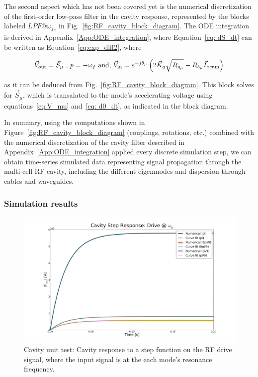 \documentclass[a4paper,12pt]{article}
\begin{document}
The second aspect which has not been covered yet is the numerical discretization of the first-order low-pass filter in the cavity response, represented by the blocks labeled $LPF@\omega_{f_{\mu}}$ in Fig.~\ref{fig:RF_cavity_block_diagram}. The ODE integration is derived in Appendix~\ref{App:ODE_integration}, where Equation~\ref{eq: dS_dt} can be written as Equation~\ref{eq:exp_diff2}, where

\begin{equation}
 \vec V_{\rm out} = \vec S_{\mu} \mbox{ , } p = -\omega_f \mbox{ and, } \vec V_{\rm in} = e^{-j\theta_{\mu}} \left(2\vec{K}_g\sqrt{R_{g_{\mu}}} - R_{b_{\mu}}\vec{I}_{\rm beam}\right)
\end{equation}

\noindent as it can be deduced from Fig.~\ref{fig:RF_cavity_block_diagram}. This block solves for $\vec S_{\mu}$, which is transalated to the mode's accelerating voltage using equations~\ref{eq:V_mu} and~\ref{eq: d0_dt}, as indicated in the block diagram.

In summary, using the computations shown in Figure~\ref{fig:RF_cavity_block_diagram} (couplings, rotations, etc.) combined with the numerical discretization of the cavity filter described in Appendix~\ref{App:ODE_integration} applied every discrete simulation step, we can obtain time-series simulated data representing signal propagation through the multi-cell RF cavity, including the different eigenmodes and dispersion through cables and waveguides.

\subsubsection{Simulation results}

\begin{figure}
\centering
\includegraphics[scale=0.26]{../figures/cavity_test_drive.png}
\caption{Cavity unit test: Cavity response to a step function on the RF drive signal, where the input signal is at the each mode's resonance frequency.}
\label{fig:cav_step1}
\end{figure}
\end{document}
